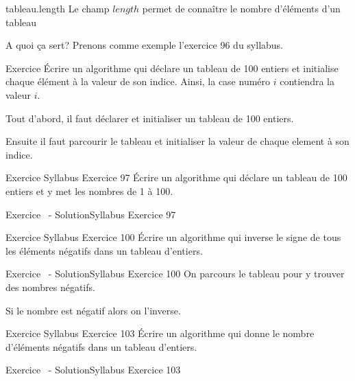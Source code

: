 \begin{frame}{tableau.length}
    Le champ $length$ permet de connaître le nombre d'éléments d'un tableau
    
\end{frame}

\begin{frame}{A quoi ça sert?}
    Prenons comme exemple l'exercice 96 du syllabus.
    \begin{block}{Exercice}
        Écrire un algorithme qui déclare un tableau de 100 entiers
        et initialise chaque élément à la valeur de son indice.
        Ainsi, la case numéro $i$ contiendra la valeur $i$.
    \end{block}
    Tout d'abord, il faut déclarer et initialiser un tableau de 100 entiers.
    
    Ensuite il faut parcourir le tableau et initialiser la valeur de chaque element à son indice.
    
\end{frame}

\begin{frame}{Exercice \theexercice}{Syllabus Exercice 97}
    Écrire un algorithme qui déclare un tableau de 100 entiers
    et y met les nombres de 1 à 100.
\end{frame}

\begin{frame}{Exercice \theexercice~- Solution}{Syllabus Exercice 97}
    
\end{frame}

\begin{frame}{Exercice \theexercice}{Syllabus Exercice 100}
    Écrire un algorithme qui
    inverse le signe de tous les éléments négatifs dans un tableau d’entiers.
\end{frame}

\begin{frame}{Exercice \theexercice~- Solution}{Syllabus Exercice 100}
    On parcours le tableau pour y trouver des nombres négatifs.
    
    Si le nombre est négatif alors on l'inverse.
\end{frame}

\begin{frame}{Exercice \theexercice}{Syllabus Exercice 103}
    Écrire un algorithme qui
    donne le nombre d’éléments négatifs dans un tableau d’entiers.
\end{frame}

\begin{frame}{Exercice \theexercice~- Solution}{Syllabus Exercice 103}
    
\end{frame}